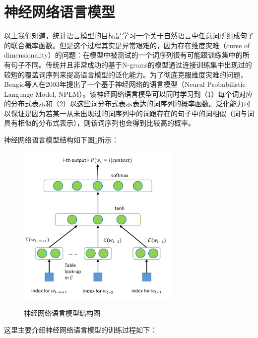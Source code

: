 \documentclass[master]{njuthesis}
\begin{document}
\section{神经网络语言模型}\label{sec_chap2_nnlm}

以上我们知道，统计语言模型的目标是学习一个关于自然语言中任意词所组成句子的联合概率函数。但是这个过程其实是异常艰难的，因为存在维度灾难（curse of dimensionality）的问题：在模型中被测试的一个词序列很有可能跟训练集中的所有句子不同。传统并且非常成功的基于N-grams的模型通过连接训练集中出现过的较短的覆盖词序列来提高语言模型的泛化能力。为了彻底克服维度灾难的问题，Bengio等人在2003年提出了一个基于神经网络的语言模型（Neural Probabilistic Language Model, NPLM）\cite{bengio2003neural}。该神经网络语言模型可以同时学习到（1）每个词对应的分布式表示和（2）以这些词分布式表示表达的词序列的概率函数。泛化能力可以保证是因为若某一从未出现过的词序列中的词跟存在的句子中的词相似（词与词具有相似的分布式表示），则该词序列也会得到比较高的概率。

神经网络语言模型结构如下图\ref{fig:nnlm}所示：
\begin{figure}[htbp]
  \centering
  \includegraphics[width= 0.7\textwidth]{figures//nnlm_chap2.pdf}\\
  \caption{神经网络语言模型结构图}\label{fig:nnlm}
\end{figure}

这里主要介绍神经网络语言模型的训练过程如下：
\end{document}
